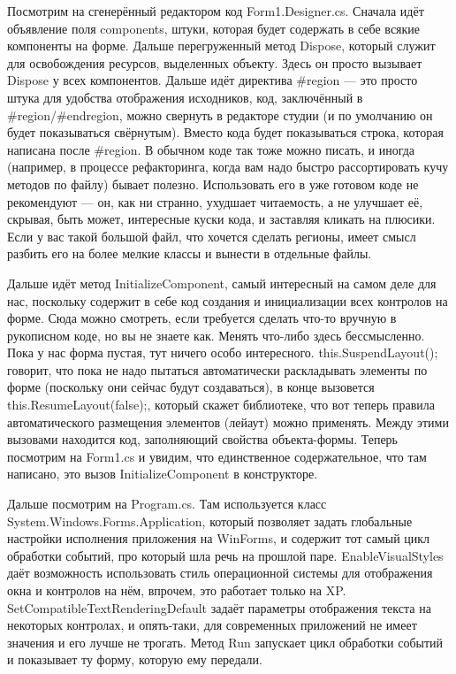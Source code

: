 \documentclass{../../text-style}
\begin{document}
Посмотрим на сгенерённый редактором код Form1.Designer.cs. Сначала идёт объявление поля components, штуки, которая будет содержать в себе всякие компоненты на форме. Дальше перегруженный метод Dispose, который служит для освобождения ресурсов, выделенных объекту. Здесь он просто вызывает Dispose у всех компонентов. Дальше идёт директива \#region --- это просто штука для удобства отображения исходников, код, заключённый в \#region/\#endregion, можно свернуть в редакторе студии (и по умолчанию он будет показываться свёрнутым). Вместо кода будет показываться строка, которая написана после \#region. В обычном коде так тоже можно писать, и иногда (например, в процессе рефакторинга, когда вам надо быстро рассортировать кучу методов по файлу) бывает полезно. Использовать его в уже готовом коде не рекомендуют --- он, как ни странно, ухудшает читаемость, а не улучшает её, скрывая, быть может, интересные куски кода, и заставляя кликать на плюсики. Если у вас такой большой файл, что хочется сделать регионы, имеет смысл разбить его на более мелкие классы и вынести в отдельные файлы.

Дальше идёт метод InitializeComponent, самый интересный на самом деле для нас, поскольку содержит в себе код создания и инициализации всех контролов на форме. Сюда можно смотреть, если требуется сделать что-то вручную в рукописном коде, но вы не знаете как. Менять что-либо здесь бессмысленно. Пока у нас форма пустая, тут ничего особо интересного. this.SuspendLayout(); говорит, что пока не надо пытаться автоматически раскладывать элементы по форме (поскольку они сейчас будут создаваться), в конце вызовется this.ResumeLayout(false);, который скажет библиотеке, что вот теперь правила автоматического размещения элементов (лейаут) можно применять. Между этими вызовами находится код, заполняющий свойства объекта-формы. Теперь посмотрим на Form1.cs и увидим, что единственное содержательное, что там написано, это вызов InitializeComponent в конструкторе. 

Дальше посмотрим на Program.cs. Там используется класс System.Windows.Forms.Application, который позволяет задать глобальные настройки исполнения приложения на WinForms, и содержит тот самый цикл обработки событий, про который шла речь на прошлой паре. EnableVisualStyles даёт возможность использовать стиль операционной системы для отображения окна и контролов на нём, впрочем, это работает только на XP. SetCompatibleTextRenderingDefault задаёт параметры отображения текста на некоторых контролах, и опять-таки, для современных приложений не имеет значения и его лучше не трогать. Метод Run запускает цикл обработки событий и показывает ту форму, которую ему передали.
\end{document}
